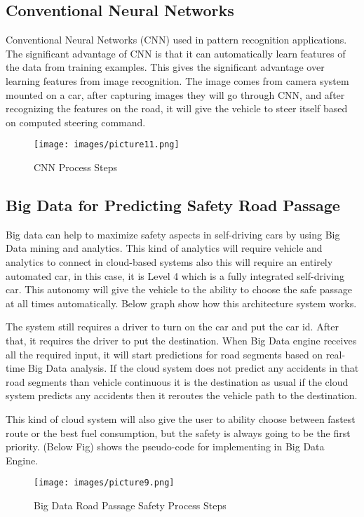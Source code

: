 \documentclass{acmart}
\begin{document}
\subsection{Conventional Neural Networks}

Conventional Neural Networks (CNN)\cite{nvidia} used in pattern recognition applications. The significant advantage of CNN is that it can automatically learn features of the data from training examples. \cite{nvidia} This gives the significant advantage over learning features from image recognition. The image comes from camera system mounted on a car, after capturing images they will go through CNN, and after recognizing the features on the road, it will give the vehicle to steer itself based on computed steering command.\cite{nvidia} 

\begin{figure}[!ht]
  \centering
      \texttt{[image: images/picture11.png]}
  \caption{CNN Process Steps}\label{F:nvidiaCNNmodel}
\end{figure}

\subsection{Big Data for Predicting Safety Road Passage}
Big data can help to maximize safety aspects in self-driving cars by using Big Data mining and analytics. This kind of analytics will require vehicle and analytics to connect in cloud-based systems also this will require an entirely automated car, in this case, it is Level 4 which is a fully integrated self-driving car. This autonomy will give the vehicle to the ability to choose the safe passage at all times automatically. Below graph show how this architecture system works. \cite{hamzah}
\par The system still requires a driver to turn on the car and put the car id. After that, it requires the driver to put the destination. When Big Data engine receives all the required input, it will start predictions for road segments based on real-time Big Data analysis. If the cloud system does not predict any accidents in that road segments than vehicle continuous it is the destination as usual if the cloud system predicts any accidents then it reroutes the vehicle path to the destination.\cite{hamzah}
\par This kind of cloud system will also give the user to ability choose between fastest route or the best fuel consumption, but the safety is always going to be the first priority. (Below Fig) shows the pseudo-code for implementing in Big Data Engine.
\begin{figure}[!ht]
  \centering
      \texttt{[image: images/picture9.png]}
  \caption{Big Data Road Passage Safety Process Steps}\label{F:architecture}
\end{figure}
\end{document}
